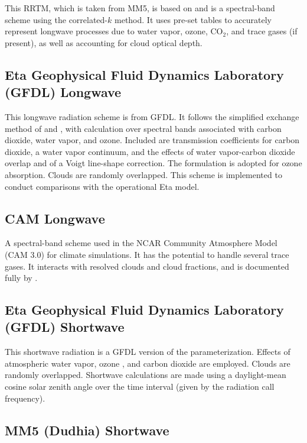 This RRTM, which is taken from MM5, is based on \citet{mlawer97} 
and is a spectral-band scheme using the correlated-$k$ method. 
It uses pre-set tables to accurately represent longwave processes due 
to water vapor, ozone, CO$_2$, and trace gases (if present), as well as 
accounting for cloud optical depth.

\subsection {Eta Geophysical Fluid Dynamics Laboratory (GFDL) Longwave}

This longwave radiation scheme is from GFDL. It follows the simplified exchange 
method of \citet{fels75} and \citet{schwarzkopf91}, 
with calculation over spectral bands associated with carbon dioxide, water vapor, 
and ozone. Included are \citet{schwarzkopf85} transmission coefficients for carbon 
dioxide, a \citet{roberts76} water vapor continuum, and the effects of 
water vapor-carbon dioxide overlap and of a Voigt line-shape correction.
The \citet{rodgers68} formulation is adopted for ozone absorption. 
Clouds are randomly overlapped. 
This scheme is implemented to conduct comparisons with the operational Eta model.

\subsection {CAM Longwave}

A spectral-band scheme used in the NCAR Community Atmosphere
Model (CAM 3.0) for climate simulations. It has the potential to handle
several trace gases. It interacts with resolved clouds and cloud fractions,
 and is documented fully by \citet{collins04}.

\subsection {Eta Geophysical Fluid Dynamics Laboratory (GFDL) Shortwave}

This shortwave radiation is a GFDL version of the \citet{lacis74}
parameterization. Effects of atmospheric water vapor, ozone 
\citep[both from][]{lacis74}, and carbon dioxide \citep{sasamori72}
are employed. Clouds are randomly overlapped. Shortwave calculations are made 
using a daylight-mean cosine solar zenith angle over the time interval 
(given by the radiation call frequency). 

\subsection {MM5 (Dudhia) Shortwave}

